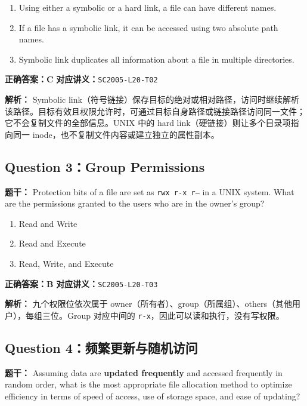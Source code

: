 \documentclass[11pt,a4paper,fontset=fandol]{ctexart}
\renewcommand{\exercisequestion}[2]{%
  \Needspace{5\baselineskip}%
  \subsection{#2}\label{exercise:#1}%
}
\renewenvironment{checkedsolution}
  {\par\nopagebreak[4]\textbf{解析：}\ignorespaces}
  {\par}
\begin{document}
\begin{enumerate}[label=\Alph*.,leftmargin=2.4em]
  \item Using either a symbolic or a hard link, a file can have different names.
  \item If a file has a symbolic link, it can be accessed using two absolute path names.
  \item Symbolic link duplicates all information about a file in multiple directories.
\end{enumerate}

\textbf{正确答案：C}\qquad
\textbf{对应讲义：}\texttt{SC2005-L20-T02}

\begin{checkedsolution}
Symbolic link（符号链接）保存目标的绝对或相对路径，访问时继续解析该路径。目标有效且权限允许时，可通过目标自身路径或链接路径访问同一文件；它不会复制文件的全部信息。UNIX 中的 hard link（硬链接）则让多个目录项指向同一 inode，也不复制文件内容或建立独立的属性副本。
\end{checkedsolution}

\exercisequestion{SC2005-HW07-Q03}{Question 3：Group Permissions}

\textbf{题干：} Protection bits of a file are set as \texttt{rwx\ r-x\ r--} in a UNIX system. What are the permissions granted to the users who are in the owner's group?

\begin{enumerate}[label=\Alph*.,leftmargin=2.4em]
  \item Read and Write
  \item Read and Execute
  \item Read, Write, and Execute
\end{enumerate}

\textbf{正确答案：B}\qquad
\textbf{对应讲义：}\texttt{SC2005-L20-T03}

\begin{checkedsolution}
九个权限位依次属于 owner（所有者）、group（所属组）、others（其他用户），每组三位。Group 对应中间的 \texttt{r-x}，因此可以读和执行，没有写权限。
\end{checkedsolution}

\exercisequestion{SC2005-HW07-Q04}{Question 4：频繁更新与随机访问}

\textbf{题干：} Assuming data are \textbf{updated frequently} and accessed frequently in random order, what is the most appropriate file allocation method to optimize efficiency in terms of speed of access, use of storage space, and ease of updating?
\end{document}
